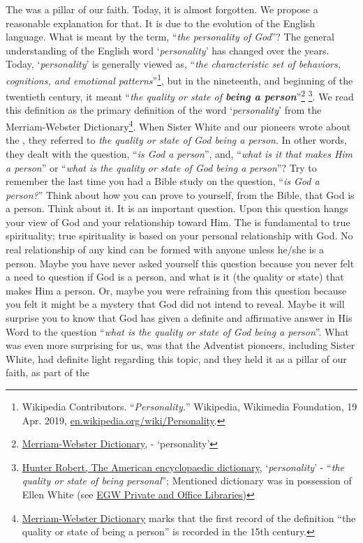 The  was a pillar of our faith. Today, it is almost forgotten. We propose a reasonable explanation for that. It is due to the evolution of the English language. What is meant by the term, “\textit{the personality of God}”? The general understanding of the English word ‘\textit{personality}’ has changed over the years. Today, ‘\textit{personality}’ is generally viewed as, “\textit{the characteristic set of behaviors, cognitions, and emotional patterns}”\footnote{Wikipedia Contributors. “\textit{Personality.}” Wikipedia, Wikimedia Foundation, 19 Apr. 2019, \href{https://en.wikipedia.org/wiki/Personality}{en.wikipedia.org/wiki/Personality}.}, but in the nineteenth, and beginning of the twentieth century, it meant “\textit{the quality or state of \textbf{being a person}}”\footnote{\href{https://www.merriam-webster.com/dictionary/personality}{Merriam-Webster Dictionary}, - ‘personality’} \footnote{\href{https://babel.hathitrust.org/cgi/pt?id=mdp.39015050663213&view=1up&seq=780}{Hunter Robert, The American encyclopaedic dictionary}, ‘\textit{personality}’ - “\textit{the quality or state of being personal}”; Mentioned dictionary was in possession of Ellen White (see \href{https://repo.adventistdigitallibrary.org/PDFs/adl-22/adl-22251050.pdf?_ga=2.116010630.1065317374.1621993520-1506151612.1617862694&fbclid=IwAR3vwmp8jxtnpPEKv0KD9mCv8dJpmRGoyIXW0CkbQAjbU0h6YaBGqhgBzbk}{EGW Private and Office Libraries})}. We read this definition as the primary definition of the word ‘\textit{personality}’ from the Merriam-Webster Dictionary\footnote{\href{https://www.merriam-webster.com/dictionary/personality\#word-history}{Merriam-Webster Dictionary} marks that the first record of the definition “the quality or state of being a person” is recorded in the 15th century.}. When Sister White and our pioneers wrote about the , they referred to \textit{the quality or state of God being a person}. In other words, they dealt with the question, “\textit{is God a person}”, and, “\textit{what is it that makes Him a person}” or “\textit{what is the quality or state of God being a person}”? Try to remember the last time you had a Bible study on the question, “\textit{is God a person?}” Think about how you can prove to yourself, from the Bible, that God is a person. Think about it. It is an important question. Upon this question hangs your view of God and your relationship toward Him. The  is fundamental to true spirituality; true spirituality is based on your personal relationship with God. No real relationship of any kind can be formed with anyone unless he/she is a person. Maybe you have never asked yourself this question because you never felt a need to question if God is a person, and what is it (the quality or state) that makes Him a person. Or, maybe you were refraining from this question because you felt it might be a mystery that God did not intend to reveal. Maybe it will surprise you to know that God has given a definite and affirmative answer in His Word to the question “\textit{what is the quality or state of God being a person}”. What was even more surprising for us, was that the Adventist pioneers, including Sister White, had definite light regarding this topic, and they held it as a pillar of our faith, as part of the 